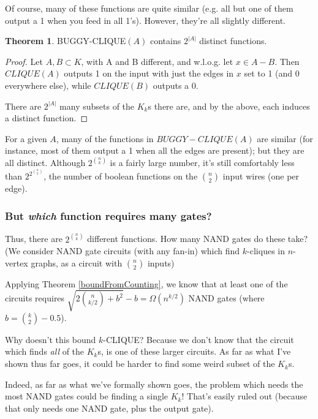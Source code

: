 \documentclass[12pt]{article}
\theoremstyle{definition}
\newtheorem{thm}{Theorem}[section]
\begin{document}
Of course, many of these functions are quite similar (e.g. all but one of them
output a 1 when you feed in all 1's). However, they're all slightly different.

\begin{thm}
\label{buggyDistinct}
BUGGY-CLIQUE$(A)$ contains $2^{|A|}$ distinct functions.
\end{thm}
\begin{proof}

Let $A,B \subset K$, with A and B different, and w.l.o.g.
let $x \in A-B$. Then $CLIQUE(A)$ outputs 1 on the input
with just the edges in $x$ set to 1 (and 0 everywhere else),
while $CLIQUE(B)$ outputs a 0.

There are $2^{|A|}$ many subsets of the $K_k$s there are,
and by the above, each induces a distinct function.
\end{proof}

For a given $A$, many of the functions in $BUGGY-CLIQUE(A)$
are similar (for instance, most
of them output a 1 when all the edges are present);
but they are all distinct.
Although $2^{n \choose k}$ is a fairly large number,
it's still comfortably less than $2^{2^{n \choose 2}}$, the number of boolean
functions on the ${n \choose 2}$ input wires (one per edge).

\subsubsection{But {\em which} function requires many gates?}

Thus, there are $2^{n \choose k}$ different functions. 
How many NAND gates do these take?
(We consider NAND gate circuits (with any fan-in) which find $k$-cliques in $n$-vertex
graphs, as a circuit with $n \choose 2$ inputs)

Applying Theorem
\ref{boundFromCounting}, we know that at least one of the circuits requires
${\sqrt {2 {n \choose {k/2}} + b^2}} - b = \Omega(n^{k/2})$ 
NAND gates (where $b = {k \choose 2} - 0.5$).

Why doesn't this bound $k$-CLIQUE?
Because we don't know that the circuit which finds {\em all} of the
$K_k$s, is one of these larger circuits. As far as what I've
shown thus far goes, it could be harder to find some weird subset of the $K_k$s.

Indeed, as far as what we've formally shown goes, the problem which needs
the most NAND gates could be finding a single $K_k$! That's easily ruled out
(because that only needs one NAND gate, plus the output gate).
\end{document}
